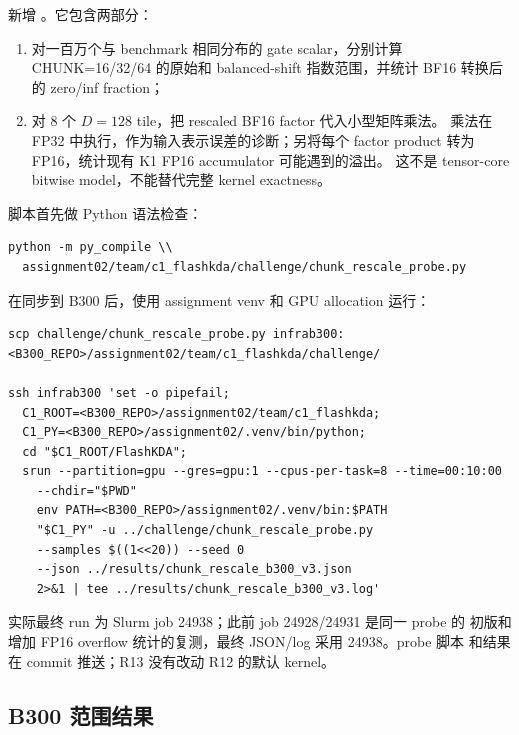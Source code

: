 新增 。它包含两部分：

\begin{enumerate}
  \item 对一百万个与 benchmark 相同分布的 gate scalar，分别计算
        CHUNK=16/32/64 的原始和 balanced-shift 指数范围，并统计 BF16
        转换后的 zero/inf fraction；
  \item 对 8 个 \(D=128\) tile，把 rescaled BF16 factor 代入小型矩阵乘法。
        乘法在 FP32 中执行，作为输入表示误差的诊断；另将每个 factor
        product 转为 FP16，统计现有 K1 FP16 accumulator 可能遇到的溢出。
        这不是 tensor-core bitwise model，不能替代完整 kernel exactness。
\end{enumerate}

脚本首先做 Python 语法检查：

\begin{lstlisting}
python -m py_compile \\
  assignment02/team/c1_flashkda/challenge/chunk_rescale_probe.py
\end{lstlisting}

在同步到 B300 后，使用 assignment venv 和 GPU allocation 运行：

\begin{lstlisting}
scp challenge/chunk_rescale_probe.py infrab300:<B300_REPO>/assignment02/team/c1_flashkda/challenge/

ssh infrab300 'set -o pipefail;
  C1_ROOT=<B300_REPO>/assignment02/team/c1_flashkda;
  C1_PY=<B300_REPO>/assignment02/.venv/bin/python;
  cd "$C1_ROOT/FlashKDA";
  srun --partition=gpu --gres=gpu:1 --cpus-per-task=8 --time=00:10:00
    --chdir="$PWD"
    env PATH=<B300_REPO>/assignment02/.venv/bin:$PATH
    "$C1_PY" -u ../challenge/chunk_rescale_probe.py
    --samples $((1<<20)) --seed 0
    --json ../results/chunk_rescale_b300_v3.json
    2>&1 | tee ../results/chunk_rescale_b300_v3.log'
\end{lstlisting}

实际最终 run 为 Slurm job 24938；此前 job 24928/24931 是同一 probe 的
初版和增加 FP16 overflow 统计的复测，最终 JSON/log 采用 24938。probe 脚本
和结果在 commit  推送；R13 没有改动 R12 的默认 kernel。

\subsection{B300 范围结果}

